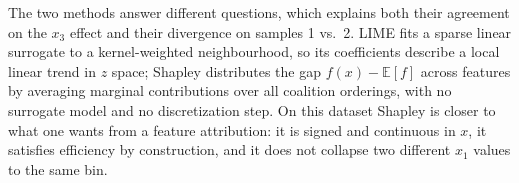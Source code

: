 \documentclass[10pt, a4paper]{article}
\begin{document}
The two methods answer different questions, which explains both their agreement on the $x_3$ effect and their divergence on samples 1 vs.\ 2. LIME fits a sparse linear surrogate to a kernel-weighted neighbourhood, so its coefficients describe a local linear trend in $z$ space; Shapley distributes the gap $f(x) - \mathbb E[f]$ across features by averaging marginal contributions over all coalition orderings, with no surrogate model and no discretization step. On this dataset Shapley is closer to what one wants from a feature attribution: it is signed and continuous in $x$, it satisfies efficiency by construction, and it does not collapse two different $x_1$ values to the same bin.
\end{document}

